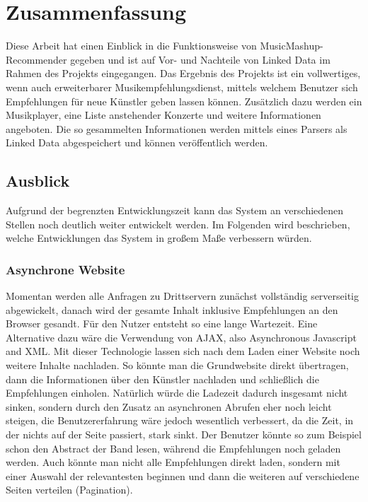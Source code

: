 \section{Zusammenfassung}

Diese Arbeit hat einen Einblick in die Funktionsweise von MusicMashup-Recommender gegeben und ist auf Vor- und Nachteile von Linked Data im Rahmen des Projekts eingegangen. Das Ergebnis des Projekts ist ein vollwertiges, wenn auch erweiterbarer Musikempfehlungsdienst, mittels welchem Benutzer sich Empfehlungen für neue Künstler geben lassen können. Zusätzlich dazu werden ein Musikplayer, eine Liste anstehender Konzerte und weitere Informationen angeboten. Die so gesammelten Informationen werden mittels eines Parsers als Linked Data abgespeichert und können veröffentlich werden.

\subsection{Ausblick}

Aufgrund der begrenzten Entwicklungszeit kann das System an verschiedenen Stellen noch deutlich weiter entwickelt werden. Im Folgenden wird beschrieben, welche Entwicklungen das System in großem Maße verbessern würden.


\subsubsection{Asynchrone Website}
Momentan werden alle Anfragen zu Drittservern zunächst vollständig serverseitig abgewickelt, danach wird der gesamte Inhalt inklusive Empfehlungen an den Browser gesandt. Für den Nutzer entsteht so eine lange Wartezeit.
Eine Alternative dazu wäre die Verwendung von AJAX, also Asynchronous Javascript and XML. Mit dieser Technologie lassen sich nach dem Laden einer Website noch weitere Inhalte nachladen. So könnte man die Grundwebsite direkt übertragen, dann die Informationen über den Künstler nachladen und schließlich die Empfehlungen einholen. Natürlich würde die Ladezeit dadurch insgesamt nicht sinken, sondern durch den Zusatz an asynchronen Abrufen eher noch leicht steigen, die Benutzererfahrung wäre jedoch wesentlich verbessert, da die Zeit, in der nichts auf der Seite passiert, stark sinkt. Der Benutzer könnte so zum Beispiel schon den Abstract der Band lesen, während die Empfehlungen noch geladen werden. Auch könnte man nicht alle Empfehlungen direkt laden, sondern mit einer Auswahl der relevantesten beginnen und dann die weiteren auf verschiedene Seiten verteilen (\glqq Pagination\grqq).


